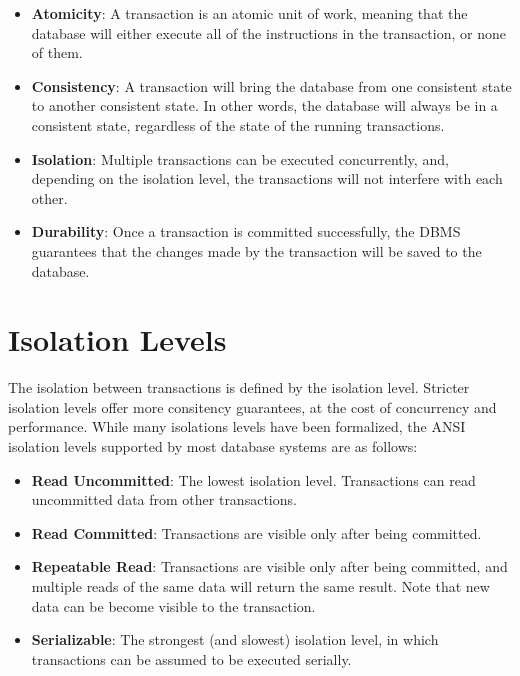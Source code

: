 \begin{itemize}
    \item \textbf{Atomicity}: A transaction is an atomic unit of work, meaning that the database will either execute all of the instructions in the transaction, or none of them.
    \item \textbf{Consistency}: A transaction will bring the database from one consistent state to another consistent state. In other words, the database will always be in a consistent state, regardless of the state of the running transactions.
    \item \textbf{Isolation}: Multiple transactions can be executed concurrently, and, depending on the isolation level, the transactions will not interfere with each other.
    \item \textbf{Durability}: Once a transaction is committed successfully, the DBMS guarantees that the changes made by the transaction will be saved to the database.
\end{itemize}


\section{Isolation Levels}

The isolation between transactions is defined by the isolation level. Stricter isolation levels offer more consitency guarantees, at the cost of concurrency and performance. While many isolations levels have been formalized, the ANSI isolation levels supported by most database systems \cite{melton1992iso_ANSI} are as follows:

\begin{itemize}
    \item \textbf{Read Uncommitted}: The lowest isolation level. Transactions can read uncommitted data from other transactions.
    \item \textbf{Read Committed}: Transactions are visible only after being committed.
    \item \textbf{Repeatable Read}: Transactions are visible only after being committed, and multiple reads of the same data will return the same result. Note that new data can be become visible to the transaction.
    \item \textbf{Serializable}: The strongest (and slowest) isolation level, in which transactions can be assumed to be executed serially.
\end{itemize}

